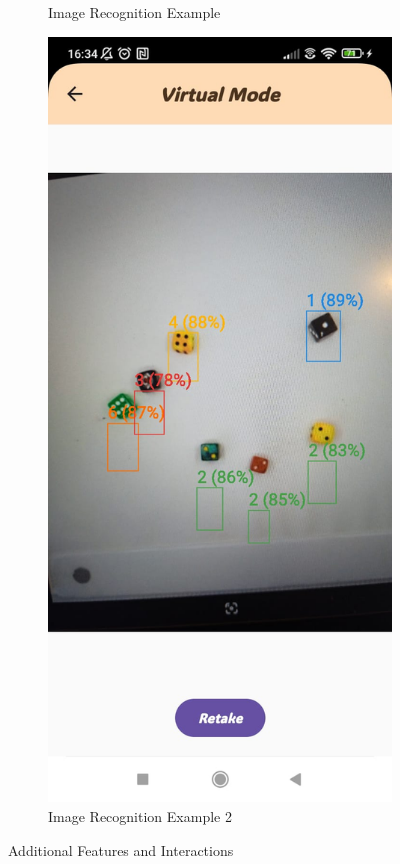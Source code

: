 \begin{figure}[ht!]
\begin{subfigure}[b]{0.27\textwidth}
        \caption{Image Recognition Example}
    \end{subfigure}
    \hfill
    \begin{subfigure}[b]{0.27\textwidth}
        \includegraphics[width=\textwidth]{img/virtual screen.jpg}
        \caption{Image Recognition Example 2}
    \end{subfigure}
    \caption{Additional Features and Interactions}
\end{figure}